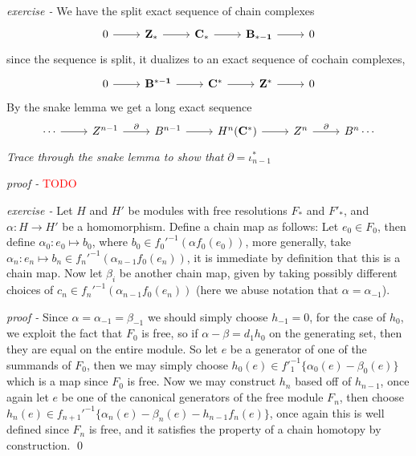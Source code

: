 \documentclass[11pt]{article}
\theoremstyle{definition}
\newcommand{\set}[1]{\{#1\}}
\begin{document}
    \emph{exercise - }\label{CEx8} We have the split exact sequence of chain complexes
    \begin{equation*}
        \begin{tikzcd}
            0 \arrow[r,"{}"] & \mathbf{Z_*} \arrow[r,"{}"] & \mathbf{C_*} \arrow[r,"{}"] & \mathbf{B_{* - 1}} \arrow[r,"{}"] & 0
        \end{tikzcd}
    \end{equation*}
    since the sequence is split, it dualizes to an exact sequence of cochain complexes,
    \begin{equation*}
        \begin{tikzcd}
            0 \arrow[r,"{}"] & \mathbf{B^{* - 1}} \arrow[r,"{}"] & \mathbf{C^*} \arrow[r,"{}"] & \mathbf{Z^*} \arrow[r,"{}"] & 0
        \end{tikzcd}
    \end{equation*}
    By the snake lemma we get a long exact sequence
    \begin{equation*}
        \begin{tikzcd}
            \cdots \arrow[r,"{}"] & Z^{n-1} \arrow[r,"{\partial}"] & B^{n-1} \arrow[r,"{}"] & H^n(\mathbf{C^*}) \arrow[r,"{}"] & Z^n \arrow[r,"{\partial}"] & B^n\cdots
        \end{tikzcd}
    \end{equation*}
    \emph{Trace through the snake lemma to show that} \(\partial = \iota_{n-1}^*\)

    \emph{proof - } \textcolor{red}{TODO}


    \emph{exercise - }\label{CEx9} Let \(H\) and \(H'\) be modules with free resolutions \(F_*\) and \(F'_*\), and \(\alpha: H \to H'\) be a homomorphism. Define a chain map as follows: Let \(e_0 \in F_0\), then define \(\alpha_0:e_0 \mapsto b_0\), where \(b_0 \in f_0'^{-1}(\alpha f_0(e_0))\), more generally, take \(\alpha_n: e_n \mapsto b_n \in f_n'^{-1}(\alpha_{n-1}f_0(e_n))\), it is immediate by definition that this is a chain map. Now let \(\beta_i\) be another chain map, given by taking possibly different choices of \(c_n \in f_n'^{-1}(\alpha_{n-1}f_0(e_n))\) (here we abuse notation that \(\alpha = \alpha_{-1}\)).

    \emph{proof - } Since \(\alpha = \alpha_{-1} = \beta_{-1}\) we should simply choose \(h_{-1} = 0\), for the case of \(h_0\), we exploit the fact that \(F_0\) is free, so if \(\alpha - \beta = d_1h_0\) on the generating set, then they are equal on the entire module. So let \(e\) be a generator of one of the summands of \(F_0\), then we may simply choose \(h_0(e) \in f'^{-1}_1\set{\alpha_0(e) - \beta_0(e)}\) which is a map since \(F_0\) is free. Now we may construct \(h_n\) based off of \(h_{n-1}\), once again let \(e\) be one of the canonical generators of the free module \(F_n\), then choose \(h_n(e) \in f_{n+1}'^{-1}\set{\alpha_n(e) - \beta_n(e) - h_{n-1}f_n(e)}\), once again this is well defined since \(F_n\) is free, and it satisfies the property of a chain homotopy by construction. \qed
\end{document}
